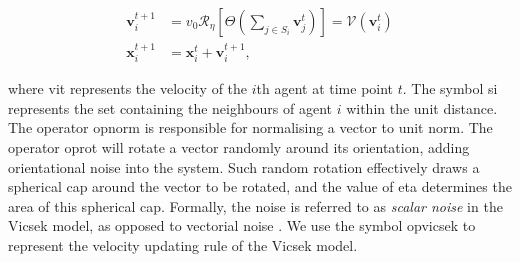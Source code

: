 \documentclass[11pt,twoside]{report}
\begin{document}
\begin{equation}
\begin{split}
	\mathbf{v}_{i}^{t+1}
	&=
    v_{0} \mathcal{R}_{\eta} \left[\Theta\left(
            \sum_{j \in S_{i}} \mathbf{v}_{j}^t
    \right)\right]
    = \mathcal{V} (\mathbf{v}_{i}^t) \\
	\mathbf{x}_i^{t+1}
	&= \mathbf{x}_i^{t} + \mathbf{v}_i^{t+1},
\end{split}
\label{eq:vicsek}
\end{equation}


\noindent where \gls{vit} represents the velocity of the $i$th agent at time point $t$.
The symbol \gls{si} represents the set containing the neighbours of agent $i$ within the unit distance.
The operator \gls{opnorm} is responsible for normalising a vector to unit norm. The operator \gls{oprot} will rotate a vector randomly around its orientation, adding orientational noise into the system. Such random rotation effectively draws a spherical cap around the vector to be rotated, and the value of \gls{eta} determines the area of this spherical cap.
Formally, the noise is referred to as \emph{scalar noise} in the Vicsek model, as opposed to vectorial noise \cite{pimentel2008}.
We use the symbol \gls{opvicsek} to represent the velocity updating rule of the Vicsek model.
\end{document}
